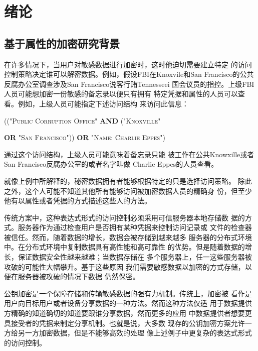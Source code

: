 \chapter{绪论}
\section{基于属性的加密研究背景}
在许多情况下，当用户对敏感数据进行加密时，这时他迫切需要建立特定
的访问控制策略决定谁可以解密数据。例如，假设FBI在Knoxvile和San
Francisco的公共反腐办公室调查涉及San Francisco说客行贿Tennesseei
国会议员的指控。上级FBI人员可能想加密一份敏感的备忘录以便只有拥有
特定凭据和属性的人员可以查看。例如，上级人员可能指定下述访问结构
来访问此信息：
\centerline{\textsc{(("Public Corruption Office" \textbf{AND} 
("Knoxville" }}
\centerline{\textsc{\textbf{OR} "San Francisco"))
\textbf{OR} "Name: Charlie Eppes")}} 
通过这个访问结构，上级人员可能意味着备忘录只能
被工作在公共Knowxille或者San Francisco反腐办公室的或者名字叫做
Charlie Eppes的人员查看。\par
就像上例中所解释的，秘密数据拥有者能够根据特定的只是选择访问策略。
除此之外，这个人可能不知道其他所有能够访问被加密数据人员的精确身
份，但至少他有以属性或者凭据的方式描述这些人的方法。\par
传统方案中，这种表达式形式的访问控制必须采用可信服务器本地存储数
据的方式。服务器作为通过检查用户是否拥有某种凭据来控制访问记录或
文件的检查器被信任。然而，随着数据的增长，数据会被存储到越来越多
服务器的分布式环境中。在分布式环境中复制数据具有高性能和高可靠性
的优势。但是随着数据的增长，保证数据安全性越来越难；当数据存储在
多个服务器上，任一这些服务器被攻破的可能性大幅攀升。基于这些原因
我们需要敏感数据以加密的方式存储，以便在服务器被攻破的情况下数据
仍然保密。\par
公钥加密是一个保障存储和传输敏感数据的强有力机制。传统上，加密被
看作是用户向目标用户或者设备分享数据的一种方法。然而这种方法仅适
用于数据提供方精确的知道确切的知道要跟谁分享数据，然而更多的应用
中数据提供者想要更具接受者的凭据来制定分享机制。也就是说，大多数
现存的公钥加密方案允许一方给另一方加密数据，但是不能够高效的处理
像上述例子中更复杂的表达式形式的访问控制。\par
